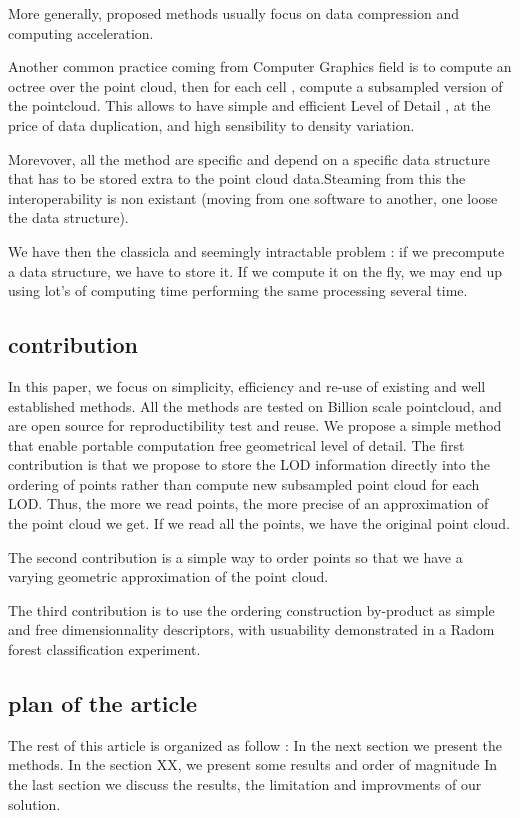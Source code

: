 		More generally, proposed methods usually focus on data compression and computing acceleration.
		
		Another common practice coming from Computer Graphics field is to compute an octree over the point cloud, then for each cell , compute a subsampled version of the pointcloud.
		This allows to have simple and efficient Level of Detail , at the price of data duplication, and high sensibility to density variation.
		
		Morevover, all the method are specific and depend on a specific data structure that has to be stored extra to the point cloud data.Steaming from this the interoperability is non existant (moving from one software to another, one loose the data structure).
		
		We have then the classicla and seemingly intractable problem : if we precompute a data structure, we have to store it. If we compute it on the fly, we may end up using lot's of computing time performing the same processing several time.
	
	\subsection{contribution}
		
		In this paper, we focus on simplicity, efficiency and re-use of existing and well established methods. All the methods are tested on Billion scale pointcloud, and are open source for reproductibility test and reuse.
		We propose a simple method that enable portable computation free geometrical level of detail.
		The first contribution is that we propose to store the LOD information directly into the ordering of points rather than compute new subsampled point cloud for each LOD.
		Thus, the more we read points, the more precise of an approximation of the point cloud we get. If we read all the points, we have the original point cloud.
		
		The second contribution is a simple way to order points so that we have a varying geometric approximation of the point cloud.
		
		The third contribution is to use the ordering construction by-product as simple and free dimensionnality descriptors, with usuability demonstrated in a Radom forest classification experiment.
			
		
	\subsection{plan of the article}
		The rest of this article is organized as follow :
		In the next section we present the methods.  
		In the section XX, we present some results and order of magnitude
		In the last section we discuss the results, the limitation and improvments of our solution.